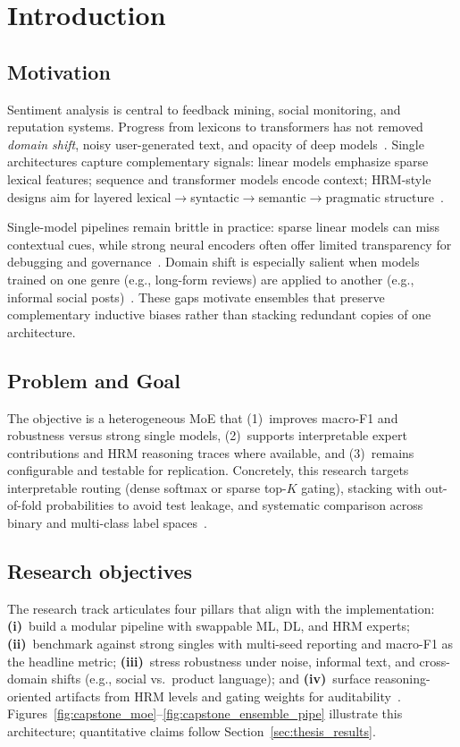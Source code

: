 \section{Introduction}
\label{sec:intro}

\subsection{Motivation}
Sentiment analysis is central to feedback mining, social monitoring, and reputation systems. Progress from lexicons to transformers has not removed \emph{domain shift}, noisy user-generated text, and opacity of deep models~\cite{ref01,ref02,ref03,ref04}. Single architectures capture complementary signals: linear models emphasize sparse lexical features; sequence and transformer models encode context; HRM-style designs aim for layered lexical$\rightarrow$syntactic$\rightarrow$semantic$\rightarrow$pragmatic structure~\cite{ref08}.

Single-model pipelines remain brittle in practice: sparse linear models can miss contextual cues, while strong neural encoders often offer limited transparency for debugging and governance~\cite{ref03,ref04}. Domain shift is especially salient when models trained on one genre (e.g., long-form reviews) are applied to another (e.g., informal social posts)~\cite{ref05,ref06}. These gaps motivate ensembles that preserve complementary inductive biases rather than stacking redundant copies of one architecture.

\subsection{Problem and Goal}
The objective is a heterogeneous MoE that (1)~improves macro-F1 and robustness versus strong single models, (2)~supports interpretable expert contributions and HRM reasoning traces where available, and (3)~remains configurable and testable for replication. Concretely, this research targets interpretable routing (dense softmax or sparse top-$K$ gating), stacking with out-of-fold probabilities to avoid test leakage, and systematic comparison across binary and multi-class label spaces~\cite{ref16,ref17,ref26,ref27}.

\subsection{Research objectives }
The research track articulates four pillars that align with the implementation: \textbf{(i)}~build a modular pipeline with swappable ML, DL, and HRM experts; \textbf{(ii)}~benchmark against strong singles with multi-seed reporting and macro-F1 as the headline metric; \textbf{(iii)}~stress robustness under noise, informal text, and cross-domain shifts (e.g., social vs.\ product language); and \textbf{(iv)}~surface reasoning-oriented artifacts from HRM levels and gating weights for auditability~\cite{ref04,ref08}. Figures~\ref{fig:capstone_moe}--\ref{fig:capstone_ensemble_pipe} illustrate this architecture; quantitative claims follow Section~\ref{sec:thesis_results}.

